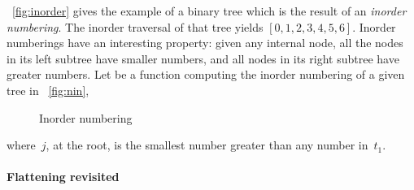 \Fig~\vref{fig:inorder} gives the example of a binary tree which is
the result of an \emph{inorder numbering}. The inorder traversal of that tree yields
\([0,1,2,3,4,5,6]\). Inorder numberings have an interesting property:
given any internal node, all the nodes in its left subtree have
smaller numbers, and all nodes in its right subtree have greater
numbers. Let 
be a function computing the inorder numbering of a given tree in
\fig~\vref{fig:nin},
\begin{figure}
\centering
{}
\caption{Inorder numbering}
\label{fig:nin}
\end{figure}
where~\(j\), at the root, is the smallest number greater than any
number in~\(t_1\).

\paragraph{Flattening revisited}
\label{par:rotation}

